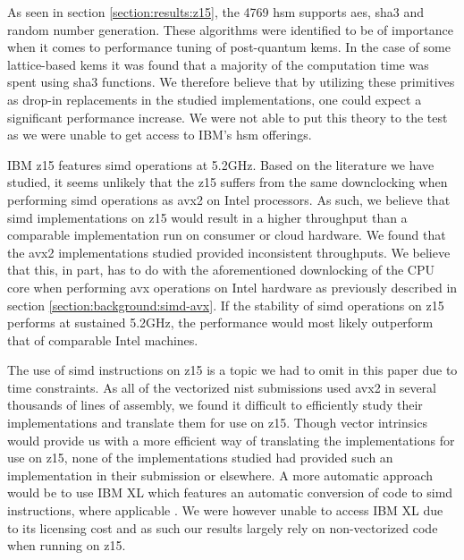 As seen in section \ref{section:results:z15}, the 4769 \gls{hsm} supports \gls{aes}, \gls{sha3} and random number generation. These algorithms were identified to be of importance when it comes to performance tuning of \gls{post-quantum} \glspl{kem}. In the case of some lattice-based \glspl{kem} it was found that a majority of the computation time was spent using \gls{sha3} functions. We therefore believe that by utilizing these primitives as drop-in replacements in the studied implementations, one could expect a significant performance increase. We were not able to put this theory to the test as we were unable to get access to IBM's \gls{hsm} offerings.

IBM \gls{z15} features \gls{simd} operations at 5.2GHz. Based on the literature we have studied, it seems unlikely that the \gls{z15} suffers from the same downclocking when performing \gls{simd} operations as \gls{avx2} on Intel processors. As such, we believe that \gls{simd} implementations on \gls{z15} would result in a higher throughput than a comparable implementation run on consumer or cloud hardware. We found that the \gls{avx2} implementations studied provided inconsistent throughputs. We believe that this, in part, has to do with the aforementioned downlocking of the CPU core when performing \gls{avx} operations on Intel hardware as previously described in section \ref{section:background:simd-avx}. If the stability of \gls{simd} operations on \gls{z15} performs at sustained 5.2GHz, the performance would most likely outperform that of comparable Intel machines.

The use of \gls{simd} instructions on \gls{z15} is a topic we had to omit in this paper due to time constraints. As all of the vectorized \gls{nist} submissions used \gls{avx2} in several thousands of lines of assembly, we found it difficult to efficiently study their implementations and translate them for use on \gls{z15}. Though vector intrinsics would provide us with a more efficient way of translating the implementations for use on \gls{z15}, none of the implementations studied had provided such an implementation in their submission or elsewhere. A more automatic approach would be to use IBM XL which features an automatic conversion of code to \gls{simd} instructions, where applicable \cite{ibm:xl-autosimd}. We were however unable to access IBM XL due to its licensing cost and as such our results largely rely on non-vectorized code when running on \gls{z15}.

